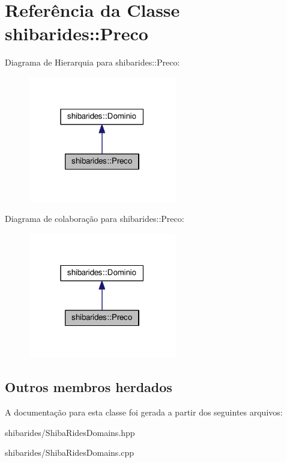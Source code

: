 \hypertarget{classshibarides_1_1Preco}{}\section{Referência da Classe shibarides\+:\+:Preco}
\label{classshibarides_1_1Preco}


Diagrama de Hierarquia para shibarides\+:\+:Preco\+:\nopagebreak
\begin{figure}[H]
\begin{center}
\leavevmode
\includegraphics[width=183pt]{classshibarides_1_1Preco__inherit__graph}
\end{center}
\end{figure}


Diagrama de colaboração para shibarides\+:\+:Preco\+:\nopagebreak
\begin{figure}[H]
\begin{center}
\leavevmode
\includegraphics[width=183pt]{classshibarides_1_1Preco__coll__graph}
\end{center}
\end{figure}
\subsection*{Outros membros herdados}


A documentação para esta classe foi gerada a partir dos seguintes arquivos\+:\begin{DoxyCompactItemize}
\item 
shibarides/Shiba\+Rides\+Domains.\+hpp\item 
shibarides/Shiba\+Rides\+Domains.\+cpp\end{DoxyCompactItemize}
